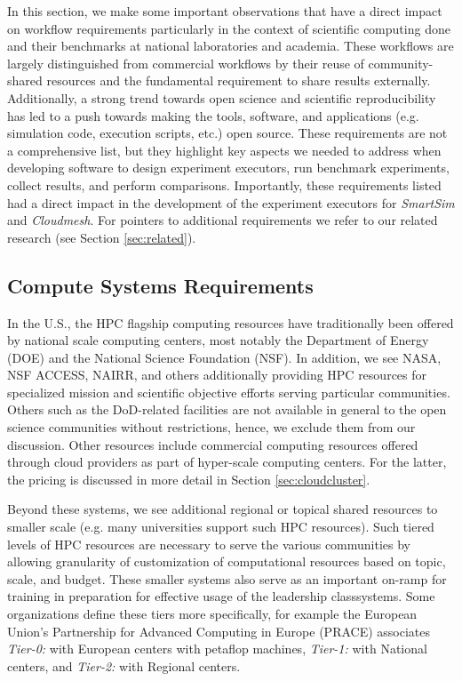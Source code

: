 \documentclass[sigconf]{acmart}
\begin{document}
In this section, we make some important observations that have a direct impact on workflow requirements particularly in the context of scientific computing done and their benchmarks at national laboratories and academia. These workflows are largely distinguished from commercial workflows by their reuse of community-shared resources and the fundamental requirement to share results externally. Additionally, a strong trend towards open science and scientific reproducibility has led to a push towards making the tools, software, and applications (e.g. simulation code, execution scripts, etc.) open source.  These requirements are not a comprehensive list, but they highlight key aspects we needed to address when developing software to design experiment executors, run benchmark experiments, collect results, and perform comparisons. Importantly,  these requirements listed had a direct impact in the development of the experiment executors for {\em SmartSim} and {\em Cloudmesh}. For pointers to additional requirements we refer to our related research (see Section \ref{sec:related}).

\subsection{Compute Systems Requirements}\label{sec:hw-requirements}

In the U.S., the HPC flagship computing resources have traditionally been offered by national scale computing centers, most notably the Department of Energy (DOE) and the National Science Foundation (NSF). In addition, we see NASA, NSF ACCESS, NAIRR, and others additionally providing HPC resources for specialized mission and scientific objective efforts serving particular communities. Others such as the DoD-related facilities are not available in general to the open science communities without restrictions, hence, we exclude them from our discussion. Other resources include commercial computing resources offered through cloud providers as part of hyper-scale computing centers. For the latter, the pricing is discussed in more detail in Section \ref{sec:cloudcluster}.

Beyond these systems, we see additional regional or topical shared resources to smaller scale (e.g. many universities support such HPC resources). Such tiered levels of HPC resources are necessary to serve the various communities by allowing granularity of customization of computational resources based on topic, scale, and budget. These smaller systems also serve as an important on-ramp for training in preparation for effective usage of the leadership classsystems. Some organizations define these tiers more specifically, for example the European Union's Partnership for Advanced Computing in Europe (PRACE) \cite{www-prace,prace-fact} associates {\em Tier-0:} with European centers with petaflop machines, {\em Tier-1:} with National centers, and {\em Tier-2:} with Regional centers.
  
\end{document}
